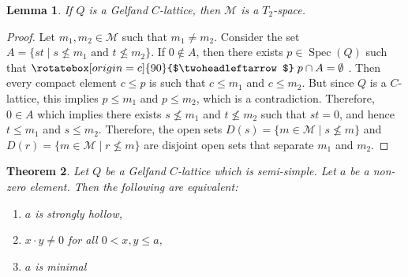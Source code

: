 \documentclass[11pt,english]{amsart}
\newtheorem{theorem}{Theorem}[section]
\newtheorem{lemma}[theorem]{Lemma}
\theoremstyle{definition}
\numberwithin{equation}{section}
\theoremstyle{remark}
\def\leq{\leqslant}
\newcommand\twoheaddownarrow{\mathrel{\rotatebox[origin=c]{90}{$\twoheadleftarrow$}}}
\begin{document}
	\begin{lemma}\label{T2}
		If $Q$ is a Gelfand $C$-lattice, then $\mathcal{M}$ is a $T_2$-space.    
	\end{lemma}
	\begin{proof}
		Let $m_1,m_2\in \mathcal{M}$ such that $m_1\neq m_2$. Consider the set $A=\{st\mid s\nleq m_1 \text{ and } t\nleq m_2\}$. If $0\notin A$, then there exists $p\in \operatorname{Spec}(Q)$ such that $\twoheaddownarrow p\cap A=\emptyset$ \cite[Lemma~1.1]{Georgescu-Voiculescu-1989}. Then every compact element $c\leq p$ is such that $c\leq m_1$ and $c\leq m_2$. But since $Q$ is a $C$-lattice, this implies $p\leq m_1$ and $p\leq m_2$, which is a contradiction. Therefore, $0\in A$ which implies  there exists $s\nleq m_1$ and $t\nleq m_2$ such that $st=0$, and hence $t\leq m_1$ and $s\leq m_2$. Therefore, the open sets $D(s)=\{m\in \mathcal{M}\mid s\nleq m\}$ and $D(r)=\{m\in \mathcal{M}\mid r\nleq m\}$ are disjoint open sets that separate $m_1$ and $m_2$.
	\end{proof}
	
	\begin{theorem}\label{T3.4}
		Let $Q$ be a Gelfand $C$-lattice which is semi-simple. Let $a$ be a non-zero element. Then the following are equivalent:
		
		\begin{enumerate}
			\item $a$ is strongly hollow,
			\item $x \cdot y \neq 0$ for all $0<x,y \leq a$,
			\item $a$ is minimal
		\end{enumerate}
	\end{theorem}
	
\end{document}
